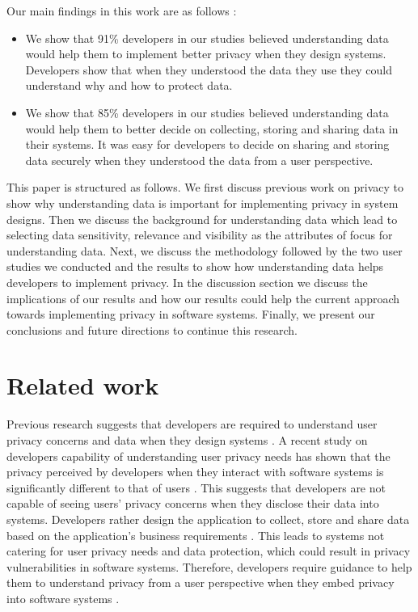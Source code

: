 \documentclass{sigchi}
\begin{document}
Our main findings in this work are as follows :

\begin{itemize}
\item We show that 91\% developers in our studies believed understanding data would help them to implement better privacy when they design systems. Developers show that when they understood the data they use they could understand why and how to protect data.
\item We show that 85\% developers in our studies believed understanding data would help them to better decide on collecting, storing and sharing data in their systems. It was easy for developers to decide on sharing and storing data securely when they understood the data from a user perspective.
\end {itemize}

This paper is structured as follows. We first discuss previous work on privacy to show why understanding data is important for implementing privacy in system designs. Then we discuss the background for understanding data which lead to selecting data sensitivity, relevance and visibility as the attributes of focus for understanding data. Next, we discuss the methodology followed by the two user studies we conducted and the results to show how understanding data helps developers to implement privacy. In the discussion section we discuss the implications of our results and how our results could help the current approach towards implementing privacy in software systems. Finally, we present our conclusions and future directions to continue this research.

\section {Related work}

Previous research suggests that developers are required to understand user privacy concerns and data when they design systems  \cite{ramokapane2017feel, rao2016expecting, lin2012expectation, kalloniatis2008addressing, senarath2018understanding}. A recent study on developers capability of understanding user privacy needs has shown that the privacy perceived by developers when they interact with software systems is significantly different to that of users \cite {senarath2018understanding}. This suggests that developers are not capable of seeing users' privacy concerns when they disclose their data into systems. Developers rather design the application to collect, store and share data based on the application's business requirements \cite {senarath2018under, senarath2018understanding}. This leads to systems not catering for user privacy needs and data protection, which could result in privacy vulnerabilities in software systems. Therefore, developers require guidance to help them to understand privacy from a user perspective when they embed privacy into software systems \cite {senarath2018under}. 
\end{document}
